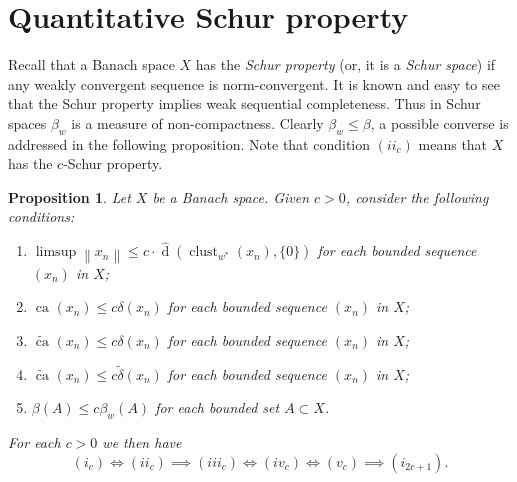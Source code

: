 \documentclass{amsart}
\numberwithin{equation}{section}
\newtheorem{prop}[thm]{Proposition}
\theoremstyle{definition}
\def\iff{\Longleftrightarrow}
\def\dh{\widehat{\operatorname{d}}}
\def\clu#1{\operatorname{clust}_{w^*}(#1)}
\def\wde#1{\widetilde{\delta}\left(#1\right)}
\def\de#1{\delta\left(#1\right)}
\newcommand{\norm}[1]{\left\|#1\right\|}
\newcommand{\ca}[2][]{\operatorname{ca}_{#1}\left(#2\right)}
\newcommand{\wca}[2][]{\widetilde{\operatorname{ca}}_{#1}\left(#2\right)}
\begin{document}
\section{Quantitative Schur property}\label{sec:schur}

Recall that a Banach space $X$ has the \emph{Schur property} (or, it is a \emph{Schur space}) if any weakly convergent sequence is norm-convergent. It is known and easy to see that the Schur property implies weak sequential completeness. Thus in Schur spaces $\beta_w$ is a measure of non-compactness. Clearly $\beta_w\le\beta$, a possible converse is addressed in the following proposition. Note that condition $(ii_c)$ means that $X$ has the $c$-Schur property. 


\begin{prop}\label{P:schur}
  Let $X$ be a Banach space. Given $c>0$, consider the following conditions:
    \begin{enumerate}[$(i_c)$]
       \item $\limsup\norm{x_n}\le c\cdot\dh(\clu{x_n},\{0\})$ for each bounded sequence $(x_n)$ in $X$;
       \item $\ca{x_n}\le c\de{x_n}$ for each bounded sequence $(x_n)$ in $X$;
       \item $\wca{x_n}\le c\de{x_n}$ for each bounded sequence $(x_n)$ in $X$;
        \item $\wca{x_n}\le c\wde{x_n}$ for each bounded sequence $(x_n)$ in $X$;
        \item $\beta(A)\le c\beta_w(A)$ for each bounded set $A\subset X$.
    \end{enumerate}
   For each $c>0$ we then have 
  $$(i_c)\iff (ii_c)\implies (iii_c)\iff(iv_c)\iff (v_c)\implies (i_{2c+1}).$$
   \iffalse
   $$\begin{array}{ccccccccc}
         (v_c)&\iff&(vi_c)&&&&&& \\
         \Downarrow &&&&&&&& \\
         (i_c)&\implies &(ii_c)&\iff&(iii_c)&\iff&(iv_c)&\implies& (i_{2c+2})  \\
         \Downarrow  &&&&&&&&\\  (v_{2c})  &&&&&&&&
   \end{array}
  .$$\fi
\end{prop}   
\end{document}

